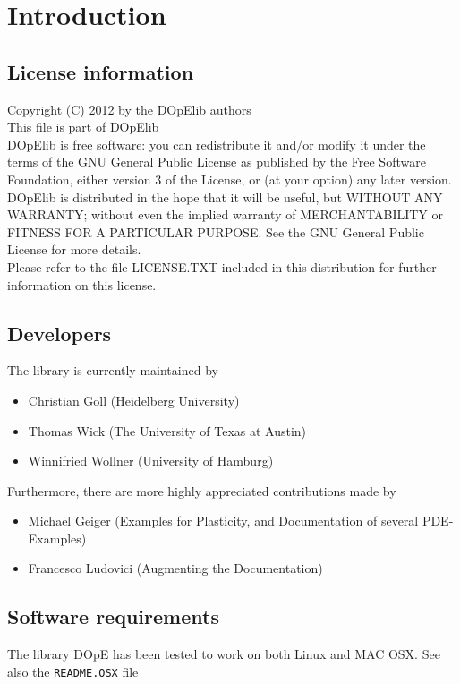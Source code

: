 \chapter{Introduction}\label{chap:intro}
\section{License information}
Copyright (C) 2012 by the DOpElib authors\\[2mm]
%
This file is part of DOpElib\\[2mm]
%
DOpElib is free software: you can redistribute it
and/or modify it under the terms of the GNU General Public
License as published by the Free Software Foundation, either
version 3 of the License, or (at your option) any later
version.\\[2mm]
%
DOpElib is distributed in the hope that it will be
useful, but WITHOUT ANY WARRANTY; without even the implied
warranty of MERCHANTABILITY or FITNESS FOR A PARTICULAR
PURPOSE.  See the GNU General Public License for more
details.\\[2mm]
%
Please refer to the file LICENSE.TXT included in this distribution
for further information on this license.


\section{Developers}
The library is currently maintained by 
\begin{itemize}
  \item Christian Goll (Heidelberg University)
  \item Thomas Wick (The University of Texas at Austin)
  \item Winnifried Wollner (University of Hamburg)
\end{itemize}

Furthermore, there are more highly appreciated contributions
made by %
\begin{itemize}
  \item Michael Geiger (Examples for Plasticity, and Documentation of several PDE-Examples)
  \item Francesco Ludovici (Augmenting the Documentation)
\end{itemize}

\section{Software requirements}
The library DOpE has been tested to work on both Linux and 
MAC OSX. See also the \texttt{README.OSX} file 


